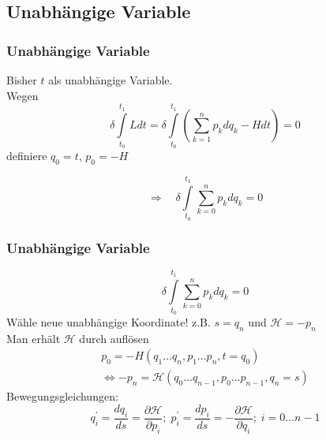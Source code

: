 \documentclass[hyperref={pdfpagelabels=false}]{beamer}
\begin{document}
\subsection*{Unabhängige Variable}
\begin{frame}
\frametitle{Unabhängige Variable}
Bisher $t$ als unabhängige Variable.\\ Wegen
\begin{equation*}
\delta \int\limits_{t_0}^{t_1} L dt = \delta \int\limits_{t_0}^{t_1}\left(\sum\limits_{k=1}^n p_k dq_k - H dt\right) = 0
\end{equation*}
definiere $q_0 = t$, $p_0 = -H$

\begin{equation*}
\Rightarrow \quad \delta \int\limits_{t_0}^{t_1}\sum\limits_{k=0}^n p_k dq_k  = 0
\end{equation*}

\end{frame}

\begin{frame}
\frametitle{Unabhängige Variable}

\begin{equation*}
\delta \int\limits_{t_0}^{t_1}\sum\limits_{k=0}^n p_k dq_k  = 0
\end{equation*}
Wähle neue unabhängige Koordinate! 
z.B. $s=q_n$  und  $\mathcal{H}= -p_n$\\\pause
Man erhält $\mathcal{H}$ durch auflösen
\begin{gather*}
p_0 = -H(q_1\dots q_n,p_1\dots p_n,t = q_0)\\ \Leftrightarrow -p_n = \mathcal{H}(q_0\dots q_{n-1},p_0\dots p_{n-1}, q_n = s)
\end{gather*}\pause
Bewegungsgleichungen:
\begin{equation*}
q_i^\prime = \frac{dq_i}{ds} = \frac{\partial \mathcal{H}}{\partial p_i};\; p_i^\prime = \frac{dp_i}{ds} = - \frac{\partial \mathcal{H}}{\partial q_i};\; i = 0\dots n-1
\end{equation*}
\end{frame}
\end{document}
